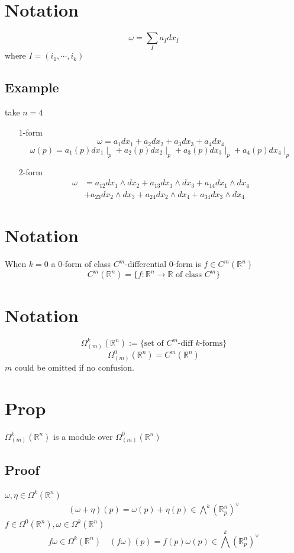 \documentclass{book}
\begin{document}
\section{Notation}
$$\omega=\sum\limits_{I}a_Idx_I$$
where $I=(i_1,\cdots,i_k)$
\subsection*{Example}
take $n=4$
\begin{itemize}
    \item [1-form]$$\omega=a_1dx_1+a_2dx_2+a_3dx_3+a_4dx_4$$
    $$\omega(p)=a_1(p)dx_1\mid_p+a_2(p)dx_2\mid_p+a_3(p)dx_3\mid_p+a_4(p)dx_4\mid_p$$
    \item [2-form]$$\begin{aligned}
    \omega&=a_{12}dx_1\wedge dx_2+a_{13}dx_1\wedge dx_3+a_{14}dx_1\wedge dx_4\\ &+a_{23}dx_2\wedge dx_3+a_{24}dx_2\wedge dx_4+a_{34}dx_3\wedge dx_4
    \end{aligned}$$
\end{itemize} 
\section{Notation}
When $k=0$ a $0$-form of class $C^m$-differential 0-form is $f\in C^m(\mathbb{R}^n)$$$C^m(\mathbb{R}^n)=\{f:\mathbb{R}^n\rightarrow \mathbb{R}\text{ of class }C^m\}$$
\section{Notation}
$$\Omega^k_{(m)}(\mathbb{R}^n):=\{\text{set of }C^m\text{-diff }k\text{-forms}\}$$
$$\Omega^0_{(m)}(\mathbb{R}^n)=C^m(\mathbb{R}^n)$$
$m$ could be omitted if no confusion.

\section{Prop}
$\Omega^k_{(m)}(\mathbb{R}^n)$ is a module over $\Omega^0_{(m)}(\mathbb{R}^n)$
\subsection*{Proof}
$\omega,\eta\in \Omega^k(\mathbb{R}^n)$
$$\begin{aligned}
    (\omega+\eta)(p)=\omega(p)+\eta(p)\in \bigwedge\limits^k(\mathbb{R}^n_p)^\vee
\end{aligned}$$
$f\in \Omega^0(\mathbb{R}^n),\omega\in \Omega^k(\mathbb{R}^n)$
$$f\omega\in \Omega^k(\mathbb{R}^n)\quad (f\omega)(p)=f(p)\omega(p)\in \bigwedge\limits^k(\mathbb{R}^n_p)^\vee$$
\end{document}

